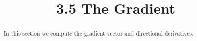 \documentclass[handout]{ximera}
\title{3.5 The Gradient}
\begin{document}
\begin{abstract}
In this section we compute the gradient vector and directional derivatives.
\end{abstract}

\maketitle
\end{document}
